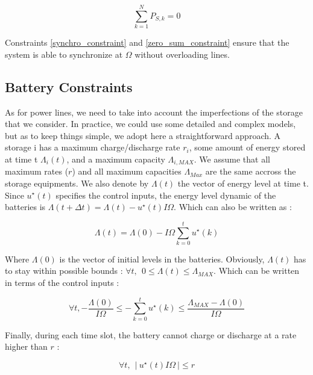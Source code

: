 \documentclass[conference]{IEEEtran}
\begin{document}
\begin{equation}
\label{zero_sum_constraint}
\sum_{k=1}^{N} P_{S,k} = 0
\end{equation}

Constraints \ref{synchro_constraint} and \ref{zero_sum_constraint} ensure that the system is able to synchronize at $\Omega$ without overloading lines.


\subsection{Battery Constraints}

As for power lines, we need to take into account the imperfections of the storage that we consider. In practice, we could use some detailed and complex models, but as to keep things simple, we adopt here a straightforward approach. A storage i has a maximum charge/discharge rate $r_i$, some amount of energy stored at time t $ \Lambda_i(t) $, and a maximum capacity $ \Lambda_{i, MAX} $. We assume that all maximum rates ($r$) and all maximum capacities $\Lambda_{Max}$ are the same accross the storage equipments. We also denote by $ \Lambda(t) $ the vector of energy level at time t. Since $ u^{\star}(t) $ specifies the control inputs, the energy level dynamic of the batteries is $ \Lambda(t+\Delta t) = \Lambda(t) - u^{\star}(t) I \Omega $. Which can also be written as :

\begin{equation}
\Lambda(t)  = \Lambda(0) - I \Omega \sum_{k=0}^{t}u^{\star}(k)
\end{equation}

Where $ \Lambda(0) $ is the vector of initial levels in the batteries. Obviously, $\Lambda(t)$ has to stay within possible bounds : $ \forall t, \ \ 0 \leq \Lambda(t) \leq \Lambda_{MAX} $. Which can be written in terms of the control inputs :

\begin{equation}
\label{level_constraints}
\forall t,-\frac{\Lambda(0)}{I \Omega} \leq -\sum_{k=0}^{t}u^{\star}(k) \leq \frac{ \Lambda_{MAX} - \Lambda(0)}{I \Omega}
\end{equation}

Finally, during each time slot, the battery cannot charge or discharge at a rate higher than $ r $ : 

\begin{equation}
\label{rate_constraints}
 \forall t,\ \ \left|\ u^{\star}(t)I \Omega\ \right| \leq r 
 \end{equation}
\end{document}
